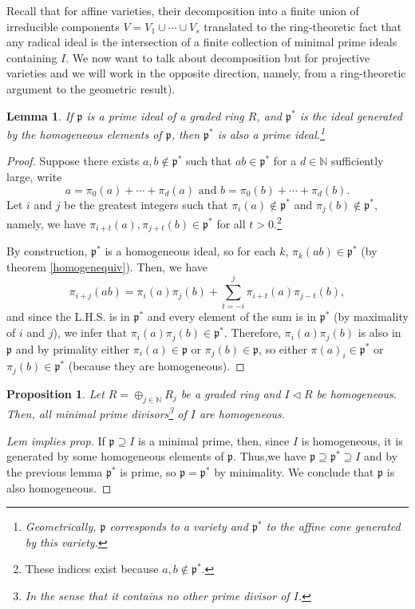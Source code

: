 \documentclass{tufte-handout} %
\newtheorem{prop}[thm]{Proposition}
\newtheorem{lem}[thm]{Lemma}
\theoremstyle{definition}
\theoremstyle{remark}
\newcommand{\N}{\mathbb{N}}
\newcommand{\lp}{{\mathfrak{p}}}
\begin{document}
Recall that for affine varieties, their decomposition into a finite union of irreducible components $V = V_1  \cup \cdots \cup V_s$ translated to the ring-theoretic fact that any radical ideal is the intersection of a finite collection of minimal prime ideals containing $I$. We now want to talk about decomposition but for projective varieties and we will work in the opposite direction, namely, from a ring-theoretic argument to the geometric result).

\begin{lem}
	If $\lp$ is a prime ideal of a graded ring $R$, and $\lp^*$ is the ideal generated by the homogeneous elements of $\lp$, then $\lp^*$ is also a prime ideal.\footnote{Geometrically, $\lp$ corresponds to a variety and $\lp^*$ to the affine cone generated by this variety.}
\end{lem}
\begin{proof}
	Suppose there exists $a,b \notin \lp^*$ such that $ab \in \lp^*$ for a $d \in \N$ sufficiently large, write
	\[a = \pi_0(a) + \cdots + \pi_d(a) \text{ and } b = \pi_0(b) + \cdots + \pi_d(b).\]
	Let $i$ and $j$ be the greatest integers such that $\pi_i(a) \notin \lp^*$ and $\pi_j(b) \notin \lp^*$, namely, we have $\pi_{i+t}(a), \pi_{j+t}(b) \in \lp^*$ for all $t > 0$.\footnote{These indices exist because $a, b\notin \lp^*$.}
	
	By construction, $\lp^*$ is a homogeneous ideal, so for each $k$, $\pi_k(ab) \in \lp^*$ (by theorem \ref{homogenequiv}). Then, we have 
	\[\pi_{i+j}(ab) = \pi_i(a)\pi_j(b) + \sum_{t = -i}^j \pi_{i+t}(a)\pi_{j-t}(b),\]
	and since the L.H.S. is in $\lp^*$ and every element of the sum is in $\lp^*$ (by maximality of $i$ and $j$), we infer that $\pi_i(a)\pi_j(b) \in \lp^*$. Therefore, $\pi_i(a)\pi_j(b)$ is also in $\lp$ and by primality either $\pi_i(a) \in \lp$ or $\pi_j(b) \in \lp$, so either $\pi(a)_i \in \lp^*$ or $\pi_j(b) \in \lp^*$ (because they are homogeneous).
\end{proof}

\begin{prop}
	Let $R = \oplus_{j\in \N} R_j$ be a graded ring and $I \lhd R$ be homogeneous. Then, all minimal prime divisors\footnote{In the sense that it contains no other prime divisor of $I$.} of $I$ are homogeneous.
\end{prop}
\begin{proof}[Lem implies prop]
	If $\lp \supseteq I$ is a minimal prime, then, since $I$ is homogeneous, it is generated by some homogeneous elements of $\lp$. Thus,we have $\lp \supseteq \lp^* \supseteq I$ and by the previous lemma $\lp^*$ is prime, so $\lp = \lp^*$ by minimality. We conclude that $\lp$ is also homogeneous.
\end{proof}
\end{document}
